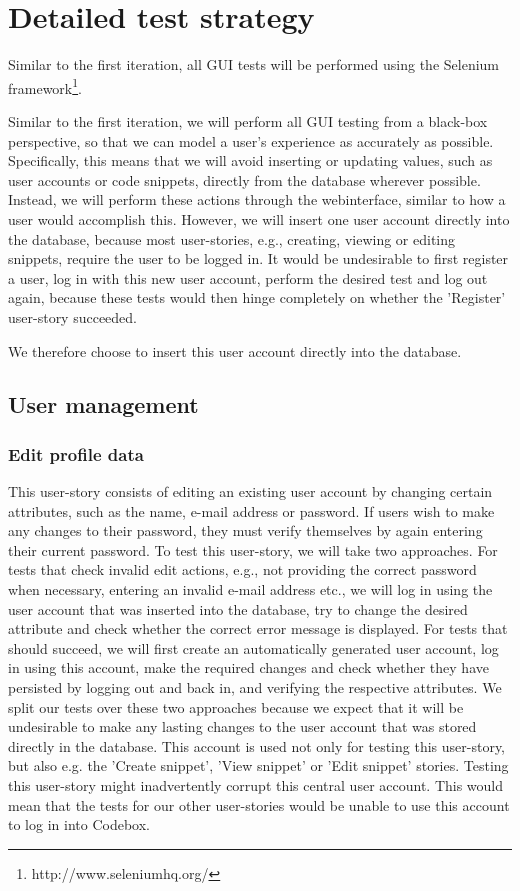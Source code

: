 \documentclass[10pt,a4paper,BCOR12mm, headexclude, footexclude,
  twoside, openright]{scrartcl}
\numberwithin{equation}{section} %
\numberwithin{figure}{section} %
\numberwithin{table}{section} %
\begin{document}
\pagestyle{plain}

\section{Detailed test strategy}

Similar to the first iteration, all GUI tests will be performed using the Selenium framework\footnote{http://www.seleniumhq.org/}.

Similar to the first iteration, we will perform all GUI testing from a black-box perspective, so that we can model a user's experience as accurately as possible.
Specifically, this means that we will avoid inserting or updating values, such as user accounts or code snippets, directly from the database wherever possible.
Instead, we will perform these actions through the webinterface, similar to how a user would accomplish this.
However, we will insert one user account directly into the database, because most user-stories, e.g., creating, viewing or editing snippets, require the user to be logged in.
It would be undesirable to first register a user, log in with this new user account, perform the desired test and log out again, because these tests would then hinge completely on whether the 'Register' user-story succeeded.

We therefore choose to insert this user account directly into the database.

\subsection{User management}

\subsubsection*{Edit profile data}

This user-story consists of editing an existing user account by changing certain attributes, such as the name, e-mail address or password. If users wish to make any changes to their password, they must verify themselves by again entering their current password.
To test this user-story, we will take two approaches. 
For tests that check invalid edit actions, e.g., not providing the correct password when necessary, entering an invalid e-mail address etc., we will log in using the user account that was inserted into the database, try to change the desired attribute and check whether the correct error message is displayed.
For tests that should succeed, we will first create an automatically generated user account, log in using this account, make the required changes and check whether they have persisted by logging out and back in, and verifying the respective attributes.
We split our tests over these two approaches because we expect that it will be undesirable to make any lasting changes to the user account that was stored directly in the database.
This account is used not only for testing this user-story, but also e.g. the 'Create snippet', 'View snippet' or 'Edit snippet' stories.
Testing this user-story might inadvertently corrupt this central user account. This would mean that the tests for our other user-stories would be unable to use this account to log in into Codebox.
\end{document}
